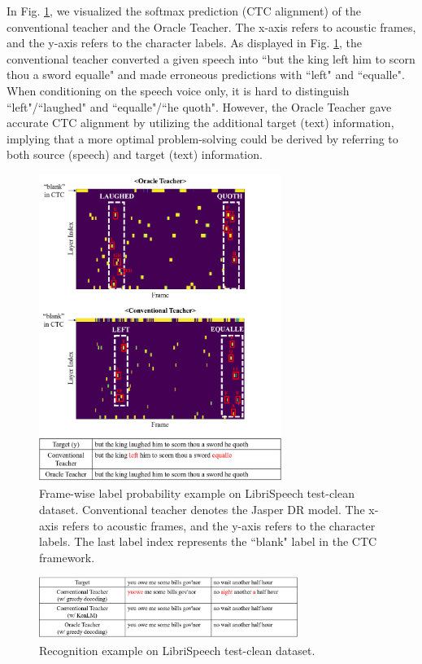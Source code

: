 \documentclass[journal]{IEEEtran}
\begin{document}
In Fig. \ref{case_asr}, we visualized the softmax prediction (CTC alignment) of the conventional teacher and the Oracle Teacher.
The x-axis refers to acoustic frames, and the y-axis refers to the character labels.
As displayed in Fig. \ref{case_asr}, the conventional teacher converted a given speech into ``but the king left him to scorn thou a sword equalle" and made erroneous predictions with ``left" and ``equalle".
When conditioning on the speech voice only, it is hard to distinguish ``left"/``laughed" and ``equalle"/``he quoth".
However, the Oracle Teacher gave accurate CTC alignment by utilizing the additional target (text) information, implying that a more optimal problem-solving could be derived by referring to both source (speech) and target (text) information.
\begin{figure}[t]
\centering
	\includegraphics[height=10cm]{case_asr.png}
	\caption{Frame-wise label probability example on LibriSpeech test-clean dataset. Conventional teacher denotes the Jasper DR model. The x-axis refers to acoustic frames, and the y-axis refers to the character labels. The last label index represents the ``blank" label in the CTC framework.}
	\label{case_asr}
\end{figure}
\begin{figure}[t]
\centering
	\includegraphics[height=2cm]{case_asr2.png}
	\caption{Recognition example on LibriSpeech test-clean dataset.}
	\label{case_asr2}
\end{figure}
\end{document}
